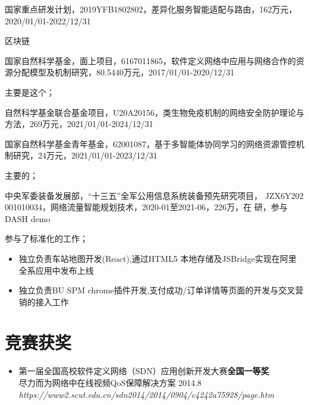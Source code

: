 \documentclass{resume}
\begin{document}
国家重点研发计划，2019YFB1802802，差异化服务智能适配与路由，162万元，2020/01/01-2022/12/31

区块链

国家自然科学基金，面上项目，6167011865，软件定义网络中应用与网络合作的资源分配模型及机制研究，80.5440万元，2017/01/01-2020/12/31

主要是这个；

自然科学基金联合基金项目，U20A20156，类生物免疫机制的网络安全防护理论与方法，269万元，2021/01/01-2024/12/31

国家自然科学基金青年基金，62001087，基于多智能体协同学习的网络资源管控机制研究，24万元，2021/01/01-2023/12/31

主要的；

中央军委装备发展部，“十三五”全军公用信息系统装备预先研究项目， JZX6Y202 001010034，网络流量智能规划技术，2020-01至2021-06，226万，在 研，参与
DASH demo 


参与了标准化的工作；
\begin{itemize}
  \item 独立负责车站地图开发(React),通过HTML5 本地存储及JSBridge实现在阿里全系应用中发布上线
  \item 独立负责BU SPM chrome插件开发,支付成功/订单详情等页面的开发与交叉营销的接入工作
\end{itemize}



\section{竞赛获奖}
\begin{itemize}[parsep=0.2ex]
  \item 第一届全国高校软件定义网络（SDN）应用创新开发大赛\textbf{全国一等奖}
  \\尽力而为网络中在线视频QoS保障解决方案 2014.8\\ \textit{https://www2.scut.edu.cn/sdn2014/2014/0904/c4242a75928/page.htm}
\end{itemize}
\end{document}

